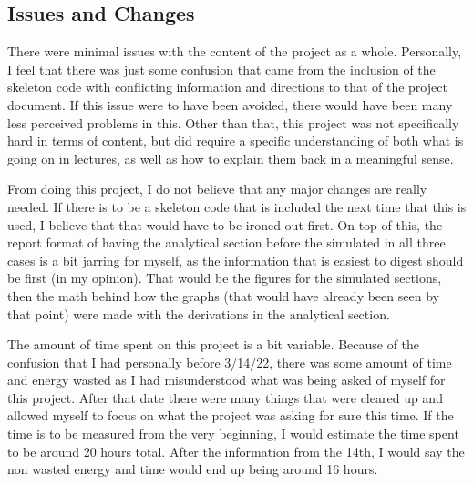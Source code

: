 \documentclass[a4paper, 11pt]{article}
\begin{document}
\subsection{Issues and Changes}
\label{sec:org3a967bc}
There were minimal issues with the content of the project as a whole. Personally, I feel that there was just some confusion that came from the inclusion of the skeleton code with conflicting information and directions to that of the project document.
If this issue were to have been avoided, there would have been many less perceived problems in this. Other than that, this project was not specifically hard in terms of content, but did require a specific understanding of both what is going on in lectures, as well as how to explain them back in a meaningful sense.

\bigskip
\noindent
From doing this project, I do not believe that any major changes are really needed. If there is to be a skeleton code that is included the next time that this is used, I believe that that would have to be ironed out first. On top of this, the report format of having the analytical section before the simulated in all three cases is a bit jarring for myself, as the information that is easiest to digest should be first (in my opinion). That would be the figures for the simulated sections, then the math behind how the graphs (that would have already been seen by that point) were made with the derivations in the analytical section.

\bigskip
\noindent
The amount of time spent on this project is a bit variable. Because of the confusion that I had personally before 3/14/22, there was some amount of time and energy wasted as I had misunderstood what was being asked of myself for this project. After that date there were many things that were cleared up and allowed myself to focus on what the project was asking for sure this time.
If the time is to be measured from the very beginning, I would estimate the time spent to be around 20 hours total. After the information from the 14th, I would say the non wasted energy and time would end up being around 16 hours.
\end{document}
